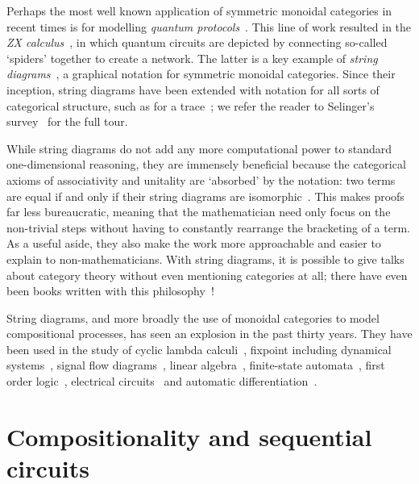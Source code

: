 Perhaps the most well known application of symmetric monoidal categories in
recent times is for modelling
\emph{quantum protocols}~\cite{abramsky2004categorical}.
This line of work resulted in the
\emph{ZX calculus}~\cite{coecke2008interacting}, in which quantum
circuits are depicted by connecting so-called `spiders' together to create a
network.
The latter is a key example of \emph{string diagrams}~\cite{joyal1991geometry},
a graphical notation for symmetric monoidal categories.
Since their inception, string diagrams have been extended with notation for all
sorts of categorical structure, such as for a trace~\cite{joyal1996traced}; we
refer the reader to Selinger's survey~\cite{selinger2011survey} for the full
tour.

While string diagrams do not add any more computational power to
standard one-dimensional reasoning, they are
immensely beneficial because the categorical axioms of associativity and
unitality are `absorbed' by the notation: two terms are equal if and only if
their string diagrams are isomorphic~\cite{kelly1980coherence,kissinger2014abstract}.
This makes proofs far less bureaucratic, meaning that the mathematician need
only focus on the non-trivial steps without having to constantly rearrange the
bracketing of a term.
As a useful aside, they also make the work more approachable and easier to
explain to non-mathematicians.
With string diagrams, it is possible to give talks about category theory without
even mentioning categories at all; there have even been books written with this
philosophy~\cite{coecke2018picturing}!

String diagrams, and more broadly the use of monoidal categories to model
compositional processes, has seen an explosion in the past thirty years.
They have been used in the study of cyclic lambda
calculi~\cite{hasegawa1997recursion}, fixpoint including dynamical
systems~\cite{baez2015categories,fong2016categorical}, signal flow
diagrams~\cite{bonchi2014categorical,bonchi2015full,bonchi2017refinement,bonchi2021survey},
linear algebra~\cite{bonchi2017interacting,zanasi2015interacting,bonchi2019graphical,boisseau2022graphical},
finite-state automata~\cite{piedeleu2021string,piedeleu2022finite}, first order
logic~\cite{bonchi2024diagrammatic}, electrical
circuits~\cite{boisseau2022string} and automatic
differentiation~\cite{alvarez-picallo2023functorial}.

\section{Compositionality and sequential circuits}

